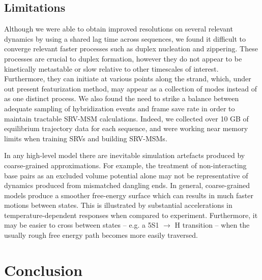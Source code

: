 \documentclass[journal=jpcbfk,manuscript=article]{achemso}
\begin{document}



\subsection{Limitations}

Although we were able to obtain improved resolutions on several relevant dynamics by using a shared lag time across sequences, we found it difficult to converge relevant faster processes such as duplex nucleation and zippering. These processes are crucial to duplex formation, however they do not appear to be kinetically metastable or slow relative to other timescales of interest. Furthermore, they can initiate at various points along the strand, which, under out present featurization method, may appear as a collection of modes instead of as one distinct process. We also found the need to strike a balance between adequate sampling of hybridization events and frame save rate in order to maintain tractable SRV-MSM calculations. Indeed, we collected over 10 GB of equilibrium trajectory data for each sequence, and were working near memory limits when training SRVs and building SRV-MSMs.

In any high-level model there are inevitable simulation artefacts produced by coarse-grained approximations. For example, the treatment of non-interacting base pairs as an excluded volume potential alone may not be representative of dynamics produced from mismatched dangling ends. In general, coarse-grained models produce a smoother free-energy surface which can results in much faster motions between states. This is illustrated by substantial accelerations in temperature-dependent responses when compared to experiment. Furthermore, it may be easier to cross between states -- e.g. a 5S1 $\rightarrow$ H transition -- when the usually rough free energy path becomes more easily traversed. 

\section{\label{sec:conc}Conclusion}
\end{document}
